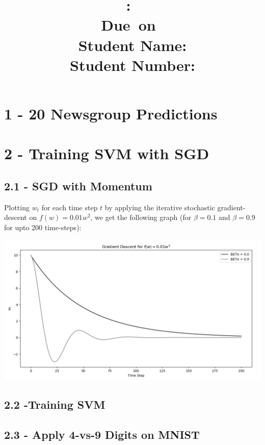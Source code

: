 \documentclass[10pt]{article}
\title{
    \vspace{2in}
    \textmd{\textbf{\hmwkClass:\ \hmwkTitle}}\\
    \vspace{0.1in}\small{Due\ on\ \hmwkDueDate}\\
    \vspace{3in}
    \vspace{0.1in}\large{Student Name: \textbf{\hmwkAuthorName} } \\
    \vspace{0.1in}\large{Student Number: \textbf{\hmwkAuthorNumber} } \\
}
\date{}
\begin{document}
\maketitle
\pagebreak

\begin{center} \tableofcontents \end{center}
\pagebreak

\clearpage
\setcounter{page}{1}

\section{1 - 20 Newsgroup Predictions}
\section{2 - Training SVM with SGD}
\subsection{2.1 - SGD with Momentum}

Plotting $w_t$ for each time step $t$ by applying the iterative stochastic gradient-descent on $ f(w) = 0.01w^2$, we get the following graph (for $\beta = 0.1$ and $\beta = 0.9$ for upto 200 time-steps):

\begin{center}
\includegraphics[scale=0.5]{2_1.png}
\end{center}



\subsection{2.2 -Training SVM}
\subsection{2.3 - Apply 4-vs-9 Digits on MNIST}
\end{document}
